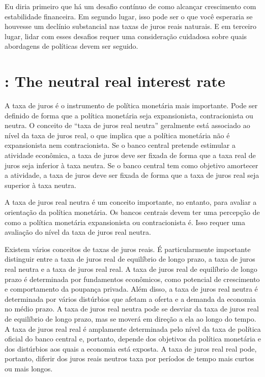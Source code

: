 Eu diria primeiro que há um desafio contínuo de como alcançar crescimento com estabilidade financeira. Em segundo lugar, isso pode ser o que você esperaria se houvesse um declínio substancial nas taxas de juros reais naturais. E em terceiro lugar, lidar com esses desafios requer uma consideração cuidadosa sobre quais abordagens de políticas devem ser seguido.
%
%
\section{\citet{Bernhardsen:2007}: The neutral real interest rate}
A taxa de juros é o instrumento de política monetária mais importante. Pode ser definido de forma que a política monetária seja expansionista, contracionista ou neutra. O conceito de “taxa de juros real neutra” geralmente está associado ao nível da taxa de juros real, o que implica que a política monetária não é expansionista nem contracionista. Se o banco central pretende estimular a atividade econômica, a taxa de juros deve ser fixada de forma que a taxa real de juros seja inferior à taxa neutra. Se o banco central tem como objetivo amortecer a atividade, a taxa de juros deve ser fixada de forma que a taxa de juros real seja superior à taxa neutra.

A taxa de juros real neutra é um conceito importante, no entanto, para avaliar a orientação da política monetária. Os bancos centrais devem ter uma percepção de como a política monetária expansionista ou contracionista é. Isso requer uma avaliação do nível da taxa de juros real neutra.

Existem vários conceitos de taxas de juros reais. É particularmente importante distinguir entre a taxa de juros real de equilíbrio de longo prazo, a taxa de juros real neutra e a taxa de juros real real. A taxa de juros real de equilíbrio de longo prazo é determinada por fundamentos econômicos, como potencial de crescimento e comportamento da poupança privada. Além disso, a taxa de juros real neutra é determinada por vários distúrbios que afetam a oferta e a demanda da economia no médio prazo. A taxa de juros real neutra pode se desviar da taxa de juros real de equilíbrio de longo prazo, mas se moverá em direção a ela ao longo do tempo. A taxa de juros real real é amplamente determinada pelo nível da taxa de política oficial do banco central e, portanto, depende dos objetivos da política monetária e dos distúrbios aos quais a economia está exposta. A taxa de juros real real pode, portanto, diferir dos juros reais neutros taxa por períodos de tempo mais curtos ou mais longos.

